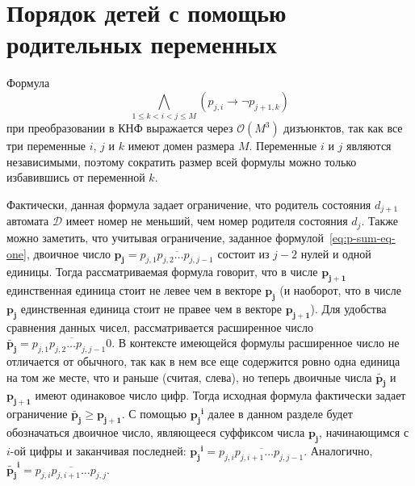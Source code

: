 
\section{Порядок детей с помощью родительных переменных}
\label{sec:tight:p-order}


Формула $$\bigwedge_{1 \leq k < i < j \leq M} \left(p_{j,i} \rightarrow \neg p_{j + 1, k}\right)$$ при преобразовании в КНФ выражается через $\mathcal{O}\left(M^{3}\right)$ дизъюнктов, так как все три переменные $i$, $j$ и $k$ имеют домен размера $M$.
Переменные $i$ и $j$ являются независимыми, поэтому сократить размер всей формулы можно только избавившись от переменной $k$.

Фактически, данная формула задает ограничение, что родитель состояния $d_{j + 1}$ автомата $\mathcal{D}$ имеет номер не меньший, чем номер родителя состояния $d_{j}$. 
Также можно заметить, что учитывая ограничение, заданное формулой~\eqref{eq:p-sum-eq-one}, двоичное число $\mathbf{p_{j}}=\overline{p_{j,1}p_{j,2}\ldots p_{j,j-1}}$ состоит из $j - 2$ нулей и одной единицы.
Тогда рассматриваемая формула говорит, что в числе $\mathbf{p_{j + 1}}$ единственная единица стоит не левее чем в векторе $\mathbf{p_{j}}$ (и наоборот, что в числе $\mathbf{p_{j}}$ единственная единица стоит не правее чем в векторе $\mathbf{p_{j + 1}}$). 
Для удобства сравнения данных чисел, рассматривается расширенное число $\tilde{\mathbf{p_{j}}} = \overline{p_{j,1}p_{j,2}\ldots p_{j,j-1}0}$.
В контексте имеющейся формулы расширенное число не отличается от обычного, так как в нем все еще содержится ровно одна единица на том же месте, что и раньше (считая, слева), но теперь двоичные числа $\tilde{\mathbf{p_{j}}}$ и $\mathbf{p_{j+1}}$ имеют одинаковое число цифр.
Тогда исходная формула фактически задает ограничение $\tilde{\mathbf{p_{j}}} \geq \mathbf{p_{j + 1}}$.
С помощью $\mathbf{p_{j}}^{\mathbf{i}}$ далее в данном разделе будет обозначаться двоичное число, являющееся суффиксом числа $\mathbf{p_{j}}$, начинающимся с $i$-ой цифры и заканчивая последней: $\mathbf{p_{j}}^{\mathbf{i}}=\overline{p_{j,i}p_{j,i+1}\ldots p_{j,j - 1}}$.
Аналогично, $\tilde{\mathbf{p_{j}}}^{\mathbf{i}}=\overline{p_{j,i}p_{j,i+1}\ldots p_{j,j}}$.

